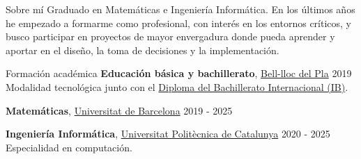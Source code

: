 \documentclass{resume} %
\begin{document}
\begin{rSection}{Sobre mí}
  Graduado en Matemáticas e Ingeniería Informática. En los últimos años
  he empezado a formarme como profesional, con interés en los entornos
  críticos, y busco participar en proyectos de mayor envergadura donde
  pueda aprender y aportar en el diseño, la toma de decisiones y la
  implementación.
\end{rSection}

\begin{rSection}{Formación académica}
  {\bf Educación básica y bachillerato},
  \href{https://www.bell-lloc.org/en/}{Bell-lloc del Pla} \hfill {2019}\\
  Modalidad tecnológica junto con el
  \href{https://www.ibo.org/}{Diploma del Bachillerato Internacional (IB)}.

  {\bf Matemáticas}, \href{https://web.ub.edu/en/home}{Universitat de
  Barcelona} \hfill {2019 - 2025}

  {\bf Ingeniería Informática},
  \href{https://www.upc.edu/en?set_language=en}{Universitat Politècnica
  de Catalunya} \hfill {2020 - 2025}\\
  Especialidad en computación.
\end{rSection}
\end{document}
